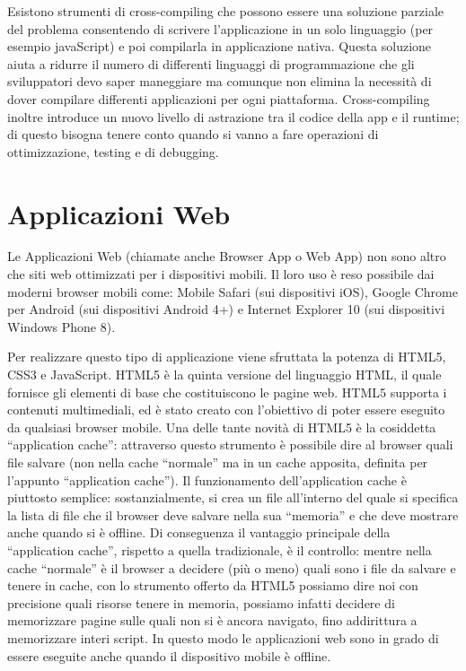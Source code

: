 		Esistono strumenti di cross-compiling che possono essere una soluzione 
		parziale del problema consentendo di scrivere l'applicazione in un solo 
		linguaggio (per esempio javaScript) e poi compilarla in applicazione 
		nativa. Questa soluzione aiuta a ridurre il numero di differenti 
		linguaggi di programmazione che gli sviluppatori devo saper maneggiare 
		ma comunque non elimina la necessità di dover compilare differenti 
		applicazioni per ogni piattaforma. Cross-compiling inoltre introduce un 
		nuovo livello di astrazione tra il codice della app e il runtime; di 
		questo bisogna tenere conto quando si vanno a fare operazioni di 
		ottimizzazione, testing e di debugging.

	\section{Applicazioni Web}
	\label{sec:webapp}
		Le Applicazioni Web (chiamate anche Browser App o Web App) non sono 
		altro che siti web ottimizzati per i dispositivi mobili. Il loro uso è 
		reso possibile dai moderni browser mobili come: Mobile Safari (sui 
		dispositivi iOS), Google Chrome per Android (sui dispositivi Android 4+) 
		e Internet Explorer 10 (sui dispositivi Windows Phone 8).
		
		Per realizzare questo tipo di applicazione viene sfruttata la potenza di 
		HTML5, CSS3 e JavaScript. HTML5 è la quinta versione del linguaggio 
		HTML, il quale fornisce gli elementi di base che costituiscono le pagine 
		web. HTML5 supporta i contenuti multimediali, ed è stato creato con 
		l'obiettivo di poter essere eseguito da qualsiasi browser mobile. Una 
		delle tante novità di HTML5 è la cosiddetta ``application cache'': 
		attraverso questo strumento è possibile dire al browser quali file 
		salvare (non nella cache ``normale'' ma in un cache apposita, definita 
		per l'appunto ``application cache''). Il funzionamento dell'application 
		cache è piuttosto semplice: sostanzialmente, si crea un file all'interno 
		del quale si specifica la lista di file che il browser deve salvare 
		nella sua ``memoria'' e che deve mostrare anche quando si è offline. Di 
		conseguenza il vantaggio principale della ``application cache'', 
		rispetto a quella tradizionale, è il controllo: mentre nella cache 
		``normale'' è il browser a decidere (più o meno) quali sono i file da 
		salvare e tenere in cache, con lo strumento offerto da HTML5 possiamo 
		dire noi con precisione quali risorse tenere in memoria, possiamo 
		infatti decidere di memorizzare pagine sulle quali non si è ancora 
		navigato, fino addirittura a memorizzare interi script. In questo modo 
		le applicazioni web sono in grado di essere eseguite anche quando il 
		dispositivo mobile è offline.


